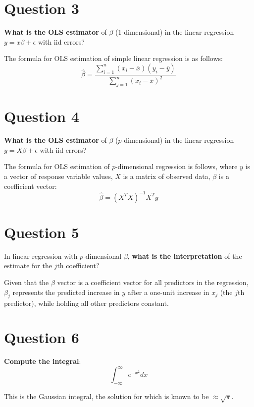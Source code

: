 \documentclass[titlepage, 12pt, leqno]{article}
\begin{document}
\pagebreak
\section{Question 3}
\begin{ex}
    \textbf{What is the OLS estimator} of $\beta$ (1-dimensional) in the linear
    regression $y = x\beta + \epsilon$ with iid errors?
\end{ex}

The formula for OLS estimation of simple linear regression is as follows:
\[
    \boxed{\hat\beta = \frac{\sum_{i=1}^{n}(x_i - \bar x)(y_i - \bar y)}
    {\sum_{j=1}^{n}(x_i - \bar x)^{2}}} 
\]

\section{Question 4}
\begin{ex}
    \textbf{What is the OLS estimator} of $\beta$ ($p$-dimensional) in the linear
    regression $y = X\beta + \epsilon$ with iid errors?
\end{ex}

The formula for OLS estimation of $p$-dimensional regression is follows, where
$y$ is a vector of response variable values, $X$ is a matrix of observed data,
$\beta$ is a coefficient vector:
\[
    \boxed{\hat\beta = \left(X^{T}X\right)^{-1}X^{T}y} 
\]
\section{Question 5}
\begin{ex}
    In linear regression with $p$-dimensional $\beta$, \textbf{what is the 
    interpretation} of the estimate for the $j$th coefficient?
\end{ex}

Given that the $\beta$ vector is a coefficient vector for all predictors in
the regression, $\beta_j$ represents the predicted increase in $y$ after a
one-unit increase in $x_j$ (the $j$th predictor), while holding all other 
predictors constant.

\pagebreak
\section{Question 6}
\begin{ex}
    \textbf{Compute the integral}:
    \[
        \int_{-\infty}^{\infty}e^{-x^{2}}dx
    \]
\end{ex}

This is the Gaussian integral, the solution for which is known to be
$\boxed{\approx \sqrt{\pi }}$.
\end{document}
